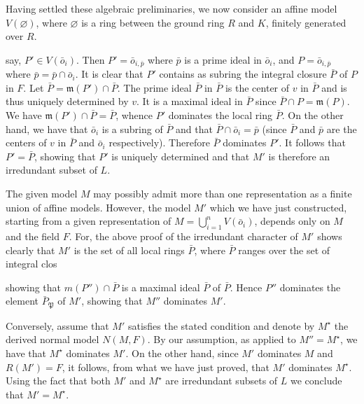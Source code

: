 Having settled these algebraic preliminaries, we now consider an affine model $V(\varnothing)$, where $\varnothing$ is a ring between the ground ring $R$ and $K$, finitely generated over $R$.

say, $P' \in V(\bar{o}_i)$. Then $P' = \bar{o}_{i,\bar{p}}$ where $\bar{p}$ is a prime ideal in $\bar{o}_i$, and $P = \bar{o}_{i,\bar{p}}$ where $\bar{p} = \bar{p} \cap \bar{o}_i$. It is clear that $P'$ contains as subring the integral closure $\bar{P}$ of $P$ in $F$. Let $\bar{P} = \mathfrak{m}(P') \cap \bar{P}$. The prime ideal $\bar{P}$ in $\bar{P}$ is the center of $v$ in $\bar{P}$ and is thus uniquely determined by $v$. It is a maximal ideal in $\bar{P}$ since $\bar{P} \cap P = \mathfrak{m}(P)$. We have $\mathfrak{m}(P') \cap \bar{P} = \bar{P}$, whence $P'$ dominates the local ring $\bar{P}$. On the other hand, we have that $\bar{o}_i$ is a subring of $\bar{P}$ and that $\bar{P} \cap \bar{o}_i = \bar{p}$ (since $\bar{P}$ and $\bar{p}$ are the centers of $v$ in $\bar{P}$ and $\bar{o}_i$ respectively). Therefore $\bar{P}$ dominates $P'$. It follows that $P' = \bar{P}$, showing that $P'$ is uniquely determined and that $M'$ is therefore an irredundant subset of $L$.

The given model $M$ may possibly admit more than one representation as a finite union of affine models. However, the model $M'$ which we have just constructed, starting from a given representation of $M = \bigcup_{i=1}^{n} V(\bar{o}_i)$, depends only on $M$ and the field $F$. For, the above proof of the irredundant character of $M'$ shows clearly that $M'$ is the set of all local rings $\bar{P}$, where $\bar{P}$ ranges over the set of integral clos

showing that $m(P'') \cap \bar{P}$ is a maximal ideal $\bar{P}$ of $\bar{P}$. Hence $P''$ dominates the element $\bar{P}_{\mathfrak{P}}$ of $M'$, showing that $M''$ dominates $M'$.

Conversely, assume that $M'$ satisfies the stated condition and denote by $M^\star$ the derived normal model $N(M, F)$. By our assumption, as applied to $M'' = M^\star$, we have that $M^\star$ dominates $M'$. On the other hand, since $M'$ dominates $M$ and $R(M') = F$, it follows, from what we have just proved, that $M'$ dominates $M^\star$. Using the fact that both $M'$ and $M^\star$ are irredundant subsets of $L$ we conclude that $M' = M^\star$.